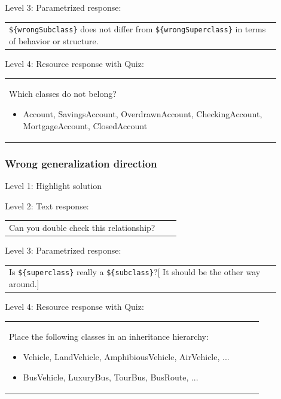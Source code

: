 \noindent Level 3: Parametrized response: \medskip

\begin{tabular}{|p{0.9\linewidth}}
\verb|${wrongSubclass}| does not differ from \verb|${wrongSuperclass}| in terms of behavior or structure.
\end{tabular} \medskip

\noindent Level 4: Resource response with Quiz: \medskip

\begin{tabular}{|p{0.9\linewidth}}
Which classes do not belong?
\begin{itemize}
    \item Account, SavingsAccount, OverdrawnAccount, CheckingAccount, MortgageAccount, ClosedAccount
\end{itemize}

\end{tabular} \medskip


\subsubsection{Wrong generalization direction}

\noindent Level 1: Highlight solution \medskip

\noindent Level 2: Text response: \medskip

\begin{tabular}{|p{0.9\linewidth}}
Can you double check this relationship?
\end{tabular} \medskip

\noindent Level 3: Parametrized response: \medskip

\begin{tabular}{|p{0.9\linewidth}}
Is \verb|${superclass}| really a \verb|${subclass}|?[ It should be the other way around.]
\end{tabular} \medskip

\noindent Level 4: Resource response with Quiz: \medskip

\begin{tabular}{|p{0.9\linewidth}}
Place the following classes in an inheritance hierarchy:

\begin{itemize}
    \item Vehicle, LandVehicle, AmphibiousVehicle, AirVehicle, ...
    \item BusVehicle, LuxuryBus, TourBus, BusRoute, ...
\end{itemize}

\end{tabular} \medskip

